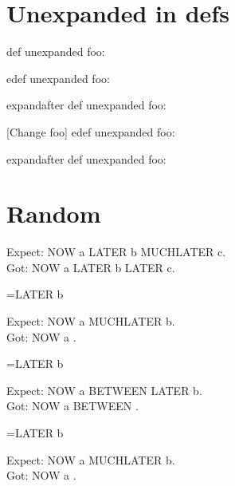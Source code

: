 \documentclass{article}
\begin{document}
\section{Unexpanded in defs}
\def\nfoo{\unexpanded{\foo}}
\edef\enfoo{\unexpanded{\foo}}
\expandafter\def\expandafter\eafoo\expandafter{\unexpanded{\foo}}

def unexpanded foo: \nfoo\relax\par
edef unexpanded foo: \enfoo\relax\par
expandafter def unexpanded foo: \eafoo\relax\par
{[Change foo]
\def\foo{foo?}
edef unexpanded foo: \enfoo\relax\par
expandafter def unexpanded foo: \eafoo\relax\par
}

\section{Random}

\def\now#1{NOW #1}

\def\later#1{LATER #1}
\edef\expanded{\now{a} \later{b} \noexpand\later{c}}
\def\later#1{MUCHLATER #1}

Expect: NOW a LATER b MUCHLATER c.\\
Got: \expanded.

\def\later#1{LATER #1}
\newtoks\tka
\tka={\later{b}}
\edef\expanded{\now{a} \the\tka}
\def\later#1{MUCHLATER #1}

Expect: NOW a MUCHLATER b.\\
Got: \expanded.


\def\later#1{LATER #1}
\newtoks\tka
\tka={\later{b}}
\def\between{BETWEEN }
\edef\expanded{\now{a} \expandafter\between\the\tka}
\def\later#1{MUCHLATER #1}

Expect: NOW a BETWEEN LATER b.\\
Got: \expanded.


\def\later#1{LATER #1}
\newtoks\tka
\tka={\later{b}}
\edef\expanded{\now{a} \expandafter\noexpand\the\tka}
\def\later#1{MUCHLATER #1}

Expect: NOW a MUCHLATER b.\\
Got: \expanded.
\end{document}
